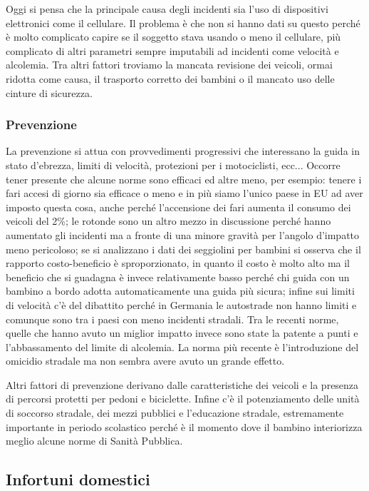Oggi si pensa che la principale causa degli incidenti sia l'uso di
dispositivi elettronici come il cellulare. Il problema è che non si
hanno dati su questo perché è molto complicato capire se il soggetto
stava usando o meno il cellulare, più complicato di altri parametri
sempre imputabili ad incidenti come velocità e alcolemia. Tra altri
fattori troviamo la mancata revisione dei veicoli, ormai ridotta come
causa, il trasporto corretto dei bambini o il mancato uso delle cinture
di sicurezza.

\subsubsection{Prevenzione}

La prevenzione si attua con provvedimenti progressivi che interessano la
guida in stato d'ebrezza, limiti di velocità, protezioni per i
motociclisti, ecc... Occorre tener presente che alcune norme sono
efficaci ed altre meno, per esempio: tenere i fari accesi di giorno sia
efficace o meno e in più siamo l'unico paese in EU ad aver imposto
questa cosa, anche perché l'accensione dei fari aumenta il consumo dei
veicoli del 2\%; le rotonde sono un altro mezzo in discussione perché
hanno aumentato gli incidenti ma a fronte di una minore gravità per
l'angolo d'impatto meno pericoloso; se si analizzano i dati dei
seggiolini per bambini si osserva che il rapporto costo-beneficio è
sproporzionato, in quanto il costo è molto alto ma il beneficio che si
guadagna è invece relativamente basso perché chi guida con un bambino a
bordo adotta automaticamente una guida più sicura; infine sui limiti di
velocità c'è del dibattito perché in Germania le autostrade non hanno
limiti e comunque sono tra i paesi con meno incidenti stradali. Tra le
recenti norme, quelle che hanno avuto un miglior impatto invece sono
state la patente a punti e l'abbassamento del limite di alcolemia. La
norma più recente è l'introduzione del omicidio stradale ma non sembra
avere avuto un grande effetto.

Altri fattori di prevenzione derivano dalle caratteristiche dei veicoli
e la presenza di percorsi protetti per pedoni e biciclette. Infine c'è
il potenziamento delle unità di soccorso stradale, dei mezzi pubblici e
l'educazione stradale, estremamente importante in periodo scolastico
perché è il momento dove il bambino interiorizza meglio alcune norme di
Sanità Pubblica.

\subsection{Infortuni domestici}

